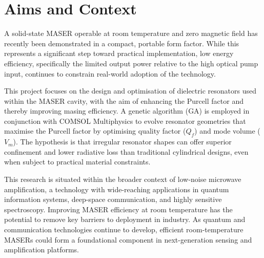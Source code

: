 \chapter{Aims and Context}
A solid-state MASER operable at room temperature and zero magnetic field has
recently been demonstrated in a compact, portable form factor. While this
represents a significant step toward practical implementation, low energy
efficiency, specifically the limited output power relative to the high optical
pump input, continues to constrain real-world adoption of the technology.

This project focuses on the design and optimisation of dielectric resonators
used within the MASER cavity, with the aim of enhancing the Purcell factor and
thereby improving masing efficiency. A genetic algorithm (GA) is employed in
conjunction with COMSOL Multiphysics to evolve resonator geometries that
maximise the Purcell factor by optimising quality factor ($Q_f$) and mode volume
($V_m$). The hypothesis is that irregular resonator shapes can offer superior
confinement and lower radiative loss than traditional cylindrical designs, even
when subject to practical material constraints.

This research is situated within the broader context of low-noise microwave
amplification, a technology with wide-reaching applications in quantum
information systems, deep-space communication, and highly sensitive
spectroscopy. Improving MASER efficiency at room temperature has the potential
to remove key barriers to deployment in industry. As quantum and communication
technologies continue to develop, efficient room-temperature MASERs could form a
foundational component in next-generation sensing and amplification platforms.
